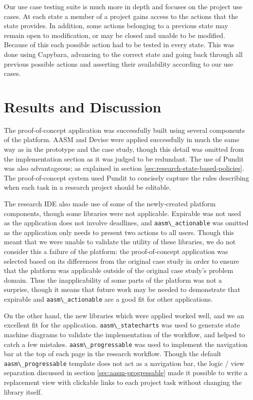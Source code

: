 \documentclass[document.tex]{subfiles}
\begin{document}
Our use case testing suite is much more in depth and focuses on the project use cases. At each state a member of a project gains access to the actions that the state provides. In addition, some actions belonging to a previous state may remain open to modification, or may be closed and unable to be modified. Because of this each possible action had to be tested in every state. This was done using Capybara, advancing to the correct state and going back through all previous possible actions and asserting their availability according to our use cases.


\section {Results and Discussion}

The proof-of-concept application was successfully built using several components of the platform. AASM and Devise were applied successfully in much the same way as in the prototype and the case study, though this detail was omitted from the implementation section as it was judged to be redundant. The use of Pundit was also advantageous; as explained in section \ref{sec:research-state-based-policies}. The proof-of-concept system used Pundit to concisely capture the rules describing when each task in a research project should be editable.

The research IDE also made use of some of the newly-created platform components, though some libraries were not applicable. Expirable was not used as the application does not involve deadlines, and \verb!aasm\_actionable! was omitted as the application only needs to present two actions to all users. Though this meant that we were unable to validate the utility of these libraries, we do not consider this a failure of the platform: the proof-of-concept application was selected based on its differences from the original case study in order to ensure that the platform was applicable outside of the original case study’s problem domain. Thus the inapplicability of some parts of the platform was not a surprise, though it means that future work may be needed to demonstrate that expirable and \verb!aasm\_actionable! are a good fit for other applications.

On the other hand, the new libraries which were applied worked well, and we an excellent fit for the application. \verb!aasm\_statecharts! was used to generate state machine diagrams to validate the implementation of the workflow, and helped to catch a few mistakes. \verb!aasm\_progressable! was used to implement the navigation bar at the top of each page in the research workflow. Though the default \verb!aasm\_progressable! template does not act as a navigation bar, the logic / view separation discussed in section \ref{sec:aasm-progressable} made it possible to write a replacement view with clickable links to each project task without changing the library itself.
\end{document}
